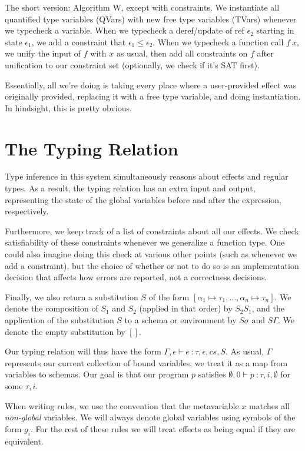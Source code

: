 \documentclass{article}
\begin{document}
	\clearpage
	
	The short version: Algorithm W, except with constraints. We instantiate all quantified type variables (QVars) with new free type variables (TVars) whenever we typecheck a variable. When we typecheck a deref/update of ref $\epsilon_2$ starting in state $\epsilon_1$, we add a constraint that $\epsilon_1 \leq \epsilon_2$. When we typecheck a function call $f\ x$, we unify the input of $f$ with $x$ as usual, then add all constraints on $f$ after unification to our constraint set (optionally, we check if it's SAT first).
	
	Essentially, all we're doing is taking every place where a user-provided effect was originally provided, replacing it with a free type variable, and doing instantiation. In hindsight, this is pretty obvious.
	
	\section*{The Typing Relation}
	Type inference in this system simultaneously reasons about effects and regular types. As a result, the typing relation has an extra input and output, representing the state of the global variables before and after the expression, respectively. 
	
	Furthermore, we keep track of a list of constraints about all our effects. We check satisfiability of these constraints whenever we generalize a function type. One could also imagine doing this check at various other points (such as whenever we add a constraint), but the choice of whether or not to do so is an implementation decision that affects how errors are reported, not a correctness decisions.
	
	Finally, we also return a substitution $S$ of the form $[\alpha_1 \mapsto \tau_1, \dots, \alpha_n \mapsto \tau_n]$. We denote the composition of $S_1$ and $S_2$ (applied in that order) by $S_2S_1$, and the application of the substitution $S$ to a schema or environment by $S\sigma$ and $S\Gamma$. We denote the empty substitution by $[]$.
	
	Our typing relation will thus have the form $\Gamma, \epsilon \vdash e\ \colon \tau, \epsilon, cs, S$. As usual, $\Gamma$ represents our current collection of bound variables; we treat it as a map from variables to schemas. Our goal is that our program $p$ satisfies $\emptyset, 0 \vdash p\ \colon \tau, i, \emptyset$ for some $\tau, i$.
	
	When writing rules, we use the convention that the metavariable $x$ matches all \emph{non-global} variables. We will always denote global variables using symbols of the form $g_i$. For the rest of these rules we will treat effects as being equal if they are equivalent.
	
\end{document}
